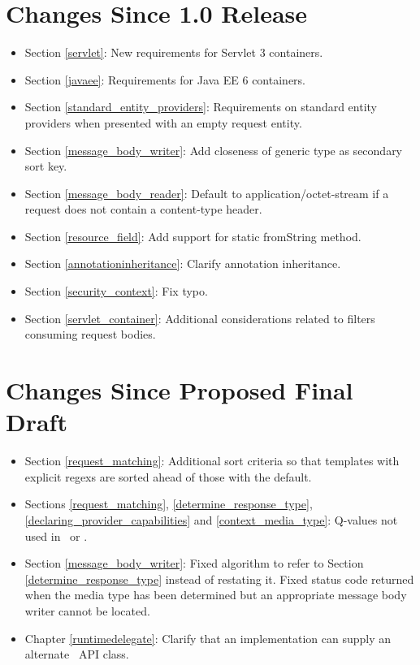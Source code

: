 \section{Changes Since 1.0 Release}

\begin{itemize}
\item Section \ref{servlet}: New requirements for Servlet 3 containers.
\item Section \ref{javaee}: Requirements for Java EE 6 containers.
\item Section \ref{standard_entity_providers}: Requirements on standard entity providers when presented with an empty request entity.
\item Section \ref{message_body_writer}: Add closeness of generic type as secondary sort key.
\item Section \ref{message_body_reader}: Default to application/octet-stream if a request does not contain a content-type header.
\item Section \ref{resource_field}: Add support for static fromString method.
\item Section \ref{annotationinheritance}: Clarify annotation inheritance.
\item Section \ref{security_context}: Fix typo.
\item Section \ref{servlet_container}: Additional considerations related to filters consuming request bodies.
\end{itemize}

\section{Changes Since Proposed Final Draft}

\begin{itemize}
\item Section \ref{request_matching}: Additional sort criteria so that templates with explicit regexs are sorted ahead of those with the default.
\item Sections \ref{request_matching}, \ref{determine_response_type}, \ref{declaring_provider_capabilities} and \ref{context_media_type}: Q-values not used in \Consumes\ or \Produces.
\item Section \ref{message_body_writer}: Fixed algorithm to refer to Section \ref{determine_response_type} instead of restating it. Fixed status code returned when the media type has been determined but an appropriate message body writer cannot be located.
\item Chapter \ref{runtimedelegate}: Clarify that an implementation can supply an alternate \rd\ API class.
\end{itemize}


